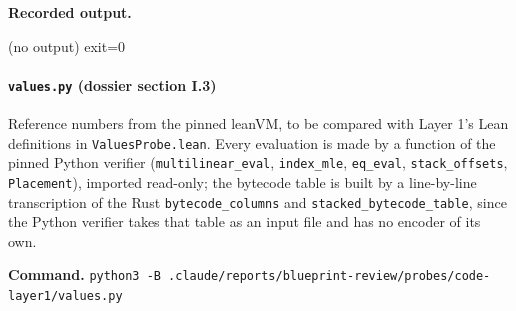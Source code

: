 \textbf{Recorded output.}

\begin{srccode}
(no output)
exit=0
\end{srccode}

\paragraph{\texttt{values.\allowbreak{}py} (dossier section I.3)}\label{sec:gen-layer1-I3}

Reference numbers from the pinned leanVM, to be compared with Layer 1's Lean definitions in \texttt{ValuesProbe.\allowbreak{}lean}. Every evaluation is made by a function of the pinned Python verifier (\texttt{multilinear\_\allowbreak{}eval}, \texttt{index\_\allowbreak{}mle}, \texttt{eq\_\allowbreak{}eval}, \texttt{stack\_\allowbreak{}offsets}, \texttt{Placement}), imported read-only; the bytecode table is built by a line-by-line transcription of the Rust \texttt{bytecode\_\allowbreak{}columns} and \texttt{stacked\_\allowbreak{}bytecode\_\allowbreak{}table}, since the Python verifier takes that table as an input file and has no encoder of its own.

\textbf{Command.} \texttt{p\allowbreak{}y\allowbreak{}t\allowbreak{}h\allowbreak{}o\allowbreak{}n\allowbreak{}3\allowbreak{} -{}\allowbreak{}B\allowbreak{} .\allowbreak{}c\allowbreak{}l\allowbreak{}a\allowbreak{}u\allowbreak{}d\allowbreak{}e\allowbreak{}/\allowbreak{}r\allowbreak{}e\allowbreak{}p\allowbreak{}o\allowbreak{}r\allowbreak{}t\allowbreak{}s\allowbreak{}/\allowbreak{}b\allowbreak{}l\allowbreak{}u\allowbreak{}e\allowbreak{}p\allowbreak{}r\allowbreak{}i\allowbreak{}n\allowbreak{}t\allowbreak{}-{}\allowbreak{}r\allowbreak{}e\allowbreak{}v\allowbreak{}i\allowbreak{}e\allowbreak{}w\allowbreak{}/\allowbreak{}p\allowbreak{}r\allowbreak{}o\allowbreak{}b\allowbreak{}e\allowbreak{}s\allowbreak{}/\allowbreak{}c\allowbreak{}o\allowbreak{}d\allowbreak{}e\allowbreak{}-{}\allowbreak{}l\allowbreak{}a\allowbreak{}y\allowbreak{}e\allowbreak{}r\allowbreak{}1\allowbreak{}/\allowbreak{}v\allowbreak{}a\allowbreak{}l\allowbreak{}u\allowbreak{}e\allowbreak{}s\allowbreak{}.\allowbreak{}p\allowbreak{}y}

